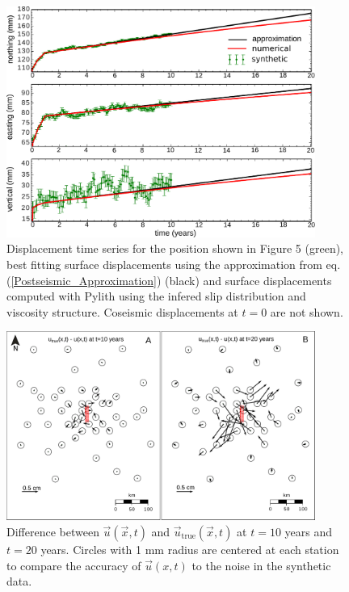 \documentclass[extra,mreferee]{gji}
\begin{document}
\begin{figure}[h!]\label{figure6}
  \centering
  \includegraphics[width=0.9\textwidth]{FinalFigures/Figure5.pdf}
  \caption{Displacement time series for the position shown in Figure 5
    (green), best fitting surface displacements using the
    approximation from eq. (\ref{Postseismic_Approximation}) (black)
    and surface displacements computed with Pylith using the infered
    slip distribution and viscosity structure. Coseismic displacements
    at $t=0$ are not shown.}
  \label{Figure 6}
\end{figure}

\begin{figure}[h!]\label{figure7}
  \centering
  \includegraphics[width=0.9\textwidth]{FinalFigures/Figure7.pdf}
  \caption{Difference between $\vec{u}(\vec{x},t)$ and
    $\vec{u}_{\mathrm{true}}(\vec{x},t)$ at $t=10$ years and $t=20$ years.
    Circles with 1 mm radius are centered at each station to compare
    the accuracy of $\vec{u}(x,t)$ to the noise in
    the synthetic data.}
  \label{Figure 7}
\end{figure}
\end{document}
